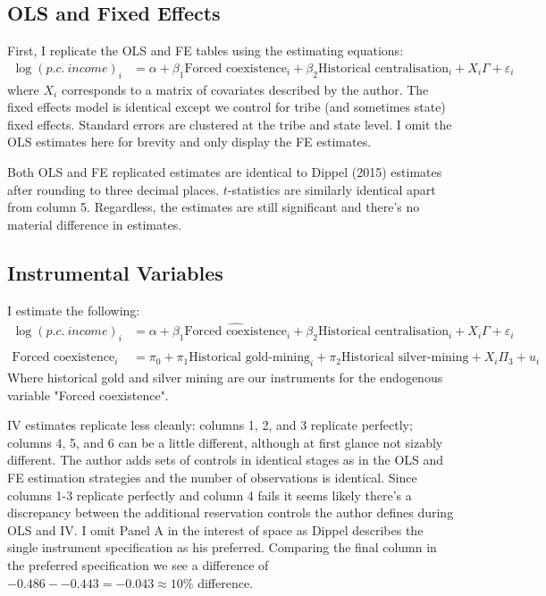 \documentclass[12pt]{article}
\begin{document}

\subsection{ OLS and Fixed Effects}
First, I replicate the OLS and FE tables using the estimating equations:
\begin{align*}
    \log(p.c. \ income)_i &= \alpha + \beta_1 \text{Forced coexistence}_i   + \beta_2 \text{Historical centralisation}_i + X_i \Gamma  + \varepsilon_i
\end{align*}
 where $X_i$ corresponds to a matrix of covariates described by the author. The 
 fixed effects model is identical except we control for tribe (and sometimes state) fixed effects. Standard 
 errors are clustered at the tribe and state level. I omit the OLS estimates here for brevity
 and only display the FE estimates. 
% 




% 
% 





Both OLS and FE replicated estimates are identical to Dippel (2015) estimates 
after rounding to three decimal places. $t$-statistics are similarly identical apart 
from column 5. Regardless, the estimates are still significant and there's no material difference in estimates.

\subsection{Instrumental Variables}
I estimate the following:
\begin{align*}
    \log(p.c. \ income)_i &= \alpha + \beta_1 \widehat{\text{Forced coexistence}}_i   + \beta_2 \text{Historical centralisation}_i + X_i \Gamma  + \varepsilon_i \\ \\
\text{Forced coexistence}_i &= \pi_0 + \pi_1 \text{Historical gold-mining}_i + \pi_2 \text{Historical silver-mining} + X_i \Pi_3 + u_i
\end{align*}
Where historical gold and silver mining are our instruments for the endogenous variable "Forced coexistence".

IV estimates replicate less cleanly: columns 1, 2, and 3 replicate perfectly; columns 4, 5, and 6 can be a little different, although at first glance not sizably different. The author 
adds sets of controls in identical stages as in the OLS and FE estimation strategies and the number of observations is identical. Since columns 1-3 
replicate perfectly and column 4 fails it seems likely there's a discrepancy between the additional reservation controls the author defines during OLS
and IV. I omit Panel A in the interest of space as Dippel describes the single instrument specification as his preferred. Comparing the final column in the preferred specification 
we see a difference of $-0.486 - - 0.443 = -0.043 \approx 10\%$ difference.
\end{document}
